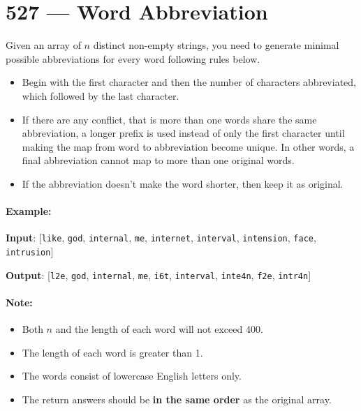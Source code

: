 \section{527 --- Word Abbreviation}
Given an array of $n$ distinct non-empty strings, you need to generate minimal possible abbreviations for every word following rules below.

\begin{itemize}
\item Begin with the first character and then the number of characters abbreviated, which followed by the last character.
\item If there are any conflict, that is more than one words share the same abbreviation, a longer prefix is used instead of only the first character until making the map from word to abbreviation become unique. In other words, a final abbreviation cannot map to more than one original words.
\item If the abbreviation doesn't make the word shorter, then keep it as original.
\end{itemize}

\paragraph{Example:}

\begin{flushleft}
\textbf{Input}: [\texttt{like}, \texttt{god}, \texttt{internal}, \texttt{me}, \texttt{internet}, \texttt{interval}, \texttt{intension}, \texttt{face}, \texttt{intrusion}]

\textbf{Output}: [\texttt{l2e}, \texttt{god}, \texttt{internal}, \texttt{me}, \texttt{i6t}, \texttt{interval}, \texttt{inte4n}, \texttt{f2e}, \texttt{intr4n}]
\end{flushleft}

\paragraph{Note:}

\begin{itemize}
\item Both $ n $ and the length of each word will not exceed 400.
\item The length of each word is greater than 1.
\item The words consist of lowercase English letters only.
\item The return answers should be \textbf{in the same order} as the original array.
\end{itemize}
